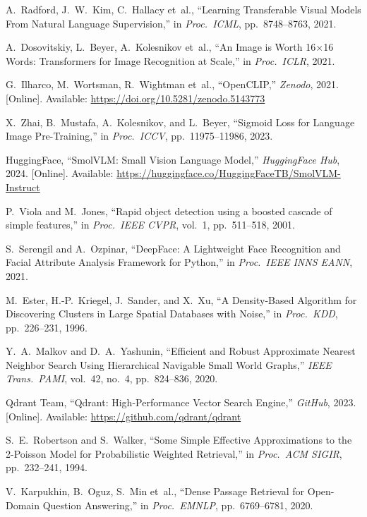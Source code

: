\documentclass[12pt,a4paper,oneside]{report}
\begin{document}
\begin{enumerate}[label={[\arabic*]}, leftmargin=2.2em]

\item A.~Radford, J.~W.~Kim, C.~Hallacy et~al.,
  ``Learning Transferable Visual Models From Natural Language
  Supervision,''
  in \textit{Proc.\ ICML}, pp.~8748--8763, 2021.

\item A.~Dosovitskiy, L.~Beyer, A.~Kolesnikov et~al.,
  ``An Image is Worth 16$\times$16 Words: Transformers for Image
  Recognition at Scale,''
  in \textit{Proc.\ ICLR}, 2021.

\item G.~Ilharco, M.~Wortsman, R.~Wightman et~al.,
  ``OpenCLIP,''
  \textit{Zenodo}, 2021.
  [Online]. Available: \url{https://doi.org/10.5281/zenodo.5143773}

\item X.~Zhai, B.~Mustafa, A.~Kolesnikov, and L.~Beyer,
  ``Sigmoid Loss for Language Image Pre-Training,''
  in \textit{Proc.\ ICCV}, pp.~11975--11986, 2023.

\item HuggingFace,
  ``SmolVLM: Small Vision Language Model,''
  \textit{HuggingFace Hub}, 2024.
  [Online]. Available: \url{https://huggingface.co/HuggingFaceTB/SmolVLM-Instruct}

\item P.~Viola and M.~Jones,
  ``Rapid object detection using a boosted cascade of simple features,''
  in \textit{Proc.\ IEEE CVPR}, vol.~1, pp.~511--518, 2001.

\item S.~Serengil and A.~Ozpinar,
  ``DeepFace: A Lightweight Face Recognition and Facial Attribute
  Analysis Framework for Python,''
  in \textit{Proc.\ IEEE INNS EANN}, 2021.

\item M.~Ester, H.-P.~Kriegel, J.~Sander, and X.~Xu,
  ``A Density-Based Algorithm for Discovering Clusters in Large Spatial
  Databases with Noise,''
  in \textit{Proc.\ KDD}, pp.~226--231, 1996.

\item Y.~A.~Malkov and D.~A.~Yashunin,
  ``Efficient and Robust Approximate Nearest Neighbor Search Using
  Hierarchical Navigable Small World Graphs,''
  \textit{IEEE Trans.\ PAMI}, vol.~42, no.~4, pp.~824--836, 2020.

\item Qdrant Team,
  ``Qdrant: High-Performance Vector Search Engine,''
  \textit{GitHub}, 2023.
  [Online]. Available: \url{https://github.com/qdrant/qdrant}

\item S.~E.~Robertson and S.~Walker,
  ``Some Simple Effective Approximations to the 2-Poisson Model for
  Probabilistic Weighted Retrieval,''
  in \textit{Proc.\ ACM SIGIR}, pp.~232--241, 1994.

\item V.~Karpukhin, B.~Oguz, S.~Min et~al.,
  ``Dense Passage Retrieval for Open-Domain Question Answering,''
  in \textit{Proc.\ EMNLP}, pp.~6769--6781, 2020.

\end{enumerate}
\end{document}
